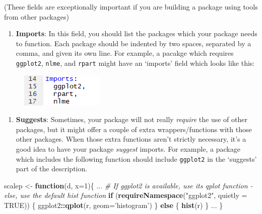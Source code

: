 \documentclass[]{book}
\newenvironment{Shaded}{\begin{snugshade}}{\end{snugshade}}
\newcommand{\KeywordTok}[1]{\textcolor[rgb]{0.13,0.29,0.53}{\textbf{#1}}}
\newcommand{\DataTypeTok}[1]{\textcolor[rgb]{0.13,0.29,0.53}{#1}}
\newcommand{\DecValTok}[1]{\textcolor[rgb]{0.00,0.00,0.81}{#1}}
\newcommand{\StringTok}[1]{\textcolor[rgb]{0.31,0.60,0.02}{#1}}
\newcommand{\CommentTok}[1]{\textcolor[rgb]{0.56,0.35,0.01}{\textit{#1}}}
\newcommand{\OtherTok}[1]{\textcolor[rgb]{0.56,0.35,0.01}{#1}}
\newcommand{\ControlFlowTok}[1]{\textcolor[rgb]{0.13,0.29,0.53}{\textbf{#1}}}
\newcommand{\OperatorTok}[1]{\textcolor[rgb]{0.81,0.36,0.00}{\textbf{#1}}}
\newcommand{\NormalTok}[1]{#1}
\providecommand{\tightlist}{%
  \setlength{\itemsep}{0pt}\setlength{\parskip}{0pt}}
\begin{document}
(These fields are exceptionally important if you are building a package
using tools from other packages)

\begin{enumerate}
\def\labelenumi{\arabic{enumi}.}
\setcounter{enumi}{11}
\tightlist
\item
  \textbf{Imports}: In this field, you should list the packages which
  your package needs to function. Each package should be indented by two
  spaces, separated by a comma, and given its own line. For example, a
  pacakge which requires \texttt{ggplot2}, \texttt{nlme}, and
  \texttt{rpart} might have an `imports' field which looks like this:
\end{enumerate}

\begin{figure}
\centering
\includegraphics{images/packageSS/imports.PNG}
\caption{}
\end{figure}

\begin{enumerate}
\def\labelenumi{\arabic{enumi}.}
\setcounter{enumi}{12}
\tightlist
\item
  \textbf{Suggests}: Sometimes, your package will not really
  \emph{require} the use of other packages, but it might offer a couple
  of extra wrappers/functions with those other packages. When those
  extra functions aren't strictly necessary, it's a good idea to have
  your package \emph{suggest} imports. For example, a package which
  includes the following function should include \texttt{ggplot2} in the
  `suggests' part of the description.
\end{enumerate}

\begin{Shaded}
\begin{Highlighting}[]
\NormalTok{scalep <-}\StringTok{ }\ControlFlowTok{function}\NormalTok{(d, }\DataTypeTok{x=}\DecValTok{1}\NormalTok{)\{}
\NormalTok{  ...}
  \CommentTok{# If ggplot2 is available, use its qplot function - else, use the default hist function}
  \ControlFlowTok{if}\NormalTok{ (}\KeywordTok{requireNamespace}\NormalTok{(}\StringTok{"ggplot2"}\NormalTok{, }\DataTypeTok{quietly =} \OtherTok{TRUE}\NormalTok{)) \{}
\NormalTok{    ggplot2}\OperatorTok{::}\KeywordTok{qplot}\NormalTok{(r, }\DataTypeTok{geom=}\StringTok{'histogram'}\NormalTok{)}
\NormalTok{  \} }\ControlFlowTok{else}\NormalTok{ \{}
    \KeywordTok{hist}\NormalTok{(r)}
\NormalTok{  \}}
\NormalTok{  ...}
\NormalTok{\}}
\end{Highlighting}
\end{Shaded}
\end{document}
